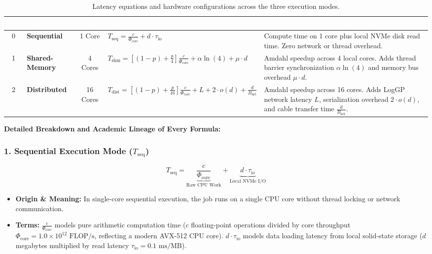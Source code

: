 \documentclass[11pt,a4paper]{article}
\begin{document}
\begin{table}[tbp]
\centering
\footnotesize
\renewcommand{\arraystretch}{1.3}
\begin{tabularx}{\textwidth}{c l c X X}
\toprule
\rowcolor{tableheader}
\textcolor{white}{\textbf{Act}} & \textcolor{white}{\textbf{Mode}} & \textcolor{white}{\textbf{Cores}} & \textcolor{white}{\textbf{Analytical Latency Formula}} & \textcolor{white}{\textbf{Physical Meaning in Plain English}} \\
\midrule
0 & \textbf{Sequential} & 1 Core & 
$T_{\text{seq}} = \frac{c}{\Phi_{\text{core}}} + d \cdot \tau_{\text{io}}$ & 
Compute time on 1 core plus local NVMe disk read time. Zero network or thread overhead. \\
\rowcolor{altrow}
1 & \textbf{Shared-Memory} & 4 Cores & 
$T_{\text{shm}} = \left[(1-p) + \frac{p}{4}\right] \frac{c}{\Phi_{\text{core}}} + \alpha \ln(4) + \mu \cdot d$ & 
Amdahl speedup across 4 local cores. Adds thread barrier synchronization $\alpha \ln(4)$ and memory bus overhead $\mu \cdot d$. \\
2 & \textbf{Distributed} & 16 Cores & 
$T_{\text{dist}} = \left[(1-p) + \frac{p}{16}\right] \frac{c}{\Phi_{\text{core}}} + L + 2 \cdot o(d) + \frac{d}{B_{\text{net}}}$ & 
Amdahl speedup across 16 cores. Adds LogGP network latency $L$, serialization overhead $2\cdot o(d)$, and cable transfer time $\frac{d}{B_{\text{net}}}$. \\
\bottomrule
\end{tabularx}
\caption{Latency equations and hardware configurations across the three execution modes.}
\label{tab:latency_formulas}
\end{table}

\noindent \textbf{Detailed Breakdown and Academic Lineage of Every Formula:}

\subsubsection*{1. Sequential Execution Mode ($T_{\text{seq}}$)}
\begin{equation}
    T_{\text{seq}} = \underbrace{\frac{c}{\Phi_{\text{core}}}}_{\text{Raw CPU Work}} + \underbrace{d \cdot \tau_{\text{io}}}_{\text{Local NVMe I/O}}
\end{equation}
\begin{itemize}[noitemsep, topsep=1pt]
    \item \textbf{Origin \& Meaning:} In single-core sequential execution, the job runs on a single CPU core without thread locking or network communication. 
    \item \textbf{Terms:} $\frac{c}{\Phi_{\text{core}}}$ models pure arithmetic computation time ($c$ floating-point operations divided by core throughput $\Phi_{\text{core}} = 1.0\times 10^{12}\text{ FLOP/s}$, reflecting a modern AVX-512 CPU core). $d \cdot \tau_{\text{io}}$ models data loading latency from local solid-state storage ($d$ megabytes multiplied by read latency $\tau_{\text{io}} = 0.1\text{ ms/MB}$).
\end{itemize}
\end{document}

